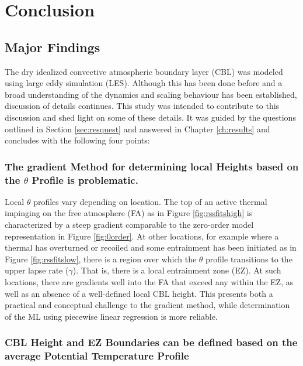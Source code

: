 
\chapter{Conclusion}
\label{ch:conc}
\setlength{\parindent}{0cm}

\section{Major Findings}

The dry idealized convective atmospheric boundary layer (\acs{CBL}) was modeled using large eddy simulation (\acs{LES}).  Although this has been done before and a broad understanding of the dynamics and scaling behaviour has been established, discussion of details continues.  This study was intended to contribute to this discussion and shed light on some of these details.  It was guided by the questions outlined in Section \ref{sec:resquest} and answered in Chapter \ref{ch:results} and concludes with the following four points:    


\subsection{The gradient Method for determining local Heights based on the $\theta$ Profile is problematic.}

Local $\theta$ profiles vary depending on location.  The top of an active thermal impinging on the free atmosphere (\acs{FA}) as in Figure \ref{fig:rssfitshigh} is characterized by a steep gradient comparable to the zero-order model representation in Figure \ref{fig:0order}.  At other locations, for example where a thermal has overturned or recoiled and some entrainment has been initiated as in Figure \ref{fig:rssfitslow}, there is a region over which the $\theta$ profile transitions to the upper lapse rate ($\gamma$). That is, there is a local entrainment zone (\acs{EZ}).  At such locations, there are gradients well into the \acs{FA} that exceed any within the \acs{EZ}, as well as an absence of a well-defined local \acs{CBL} height.  This presents both a practical and conceptual challenge to the gradient method, while determination of the \acs{ML} using piecewise linear regression is more reliable. 

\subsection{\acs{CBL} Height and \acs{EZ} Boundaries can be defined based on the average Potential Temperature Profile}

